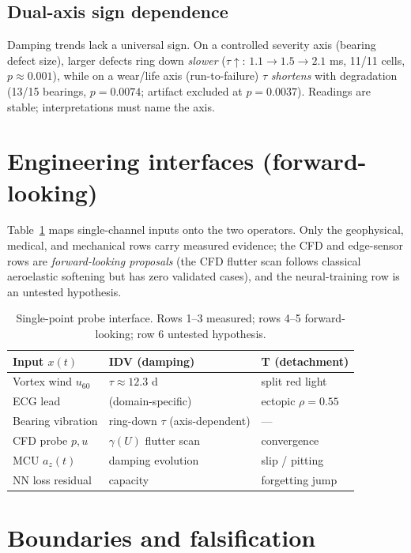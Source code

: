 \documentclass[10pt,twocolumn]{article}
\begin{document}
\subsection{Dual-axis sign dependence}

Damping trends lack a universal sign. On a controlled severity axis
(bearing defect size), larger defects ring down \emph{slower}
($\tau \uparrow$: $1.1 \to 1.5 \to 2.1$ ms, 11/11 cells, $p \approx 0.001$),
while on a wear/life axis (run-to-failure) $\tau$ \emph{shortens} with
degradation (13/15 bearings, $p = 0.0074$; artifact excluded at
$p = 0.0037$). Readings are stable; interpretations must name the axis.

\section{Engineering interfaces (forward-looking)}

Table~\ref{tab} maps single-channel inputs onto the two operators. Only the
geophysical, medical, and mechanical rows carry measured evidence; the CFD
and edge-sensor rows are \emph{forward-looking proposals} (the CFD flutter
scan follows classical aeroelastic softening \cite{Bisplinghoff} but has zero
validated cases), and the neural-training row is an untested hypothesis.

\begin{table}[b]
\centering\small
\begin{tabular}{p{}p{}p{}}
\toprule
Input $x(t)$ & IDV (damping) & T (detachment) \\
\midrule
Vortex wind $u_{60}$ & $\tau \approx 12.3$ d & split red light \\
ECG lead & (domain-specific) & ectopic $\rho{=}0.55$ \\
Bearing vibration & ring-down $\tau$ (axis-dependent) & --- \\
CFD probe $p,u$ & $\gamma(U)$ flutter scan & convergence \\
MCU $a_z(t)$ & damping evolution & slip / pitting \\
NN loss residual & capacity & forgetting jump \\
\bottomrule
\end{tabular}
\caption{Single-point probe interface. Rows 1--3 measured; rows 4--5
forward-looking; row 6 untested hypothesis.}
\label{tab}
\end{table}

\section{Boundaries and falsification}
\end{document}
